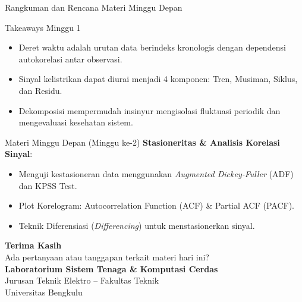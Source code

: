 \documentclass[aspectratio=169, 10pt]{beamer}
\begin{document}
\begin{frame}{Rangkuman dan Rencana Materi Minggu Depan}
    \begin{block}{Takeaways Minggu 1}
        \begin{itemize}
            \item Deret waktu adalah urutan data berindeks kronologis dengan dependensi autokorelasi antar observasi.
            \item Sinyal kelistrikan dapat diurai menjadi 4 komponen: Tren, Musiman, Siklus, dan Residu.
            \item Dekomposisi mempermudah insinyur mengisolasi fluktuasi periodik dan mengevaluasi kesehatan sistem.
        \end{itemize}
    \end{block}

    \vspace{0.2cm}
    \begin{alertblock}{Materi Minggu Depan (Minggu ke-2)}
        \textbf{Stasioneritas \& Analisis Korelasi Sinyal}:
        \begin{itemize}
            \item Menguji kestasioneran data menggunakan \textit{Augmented Dickey-Fuller} (ADF) dan KPSS Test.
            \item Plot Korelogram: Autocorrelation Function (ACF) \& Partial ACF (PACF).
            \item Teknik Diferensiasi (\textit{Differencing}) untuk menstasionerkan sinyal.
        \end{itemize}
    \end{alertblock}
\end{frame}

\begin{frame}[plain]
    \begin{center}
        \vspace{1.5cm}
        {\Huge \color{mainblue} \textbf{Terima Kasih}}\\[0.4cm]
        {\large Ada pertanyaan atau tanggapan terkait materi hari ini?}\\[1.2cm]
        
        \textbf{Laboratorium Sistem Tenaga \& Komputasi Cerdas}\\
        Jurusan Teknik Elektro -- Fakultas Teknik\\
        Universitas Bengkulu
    \end{center}
\end{frame}
\end{document}
